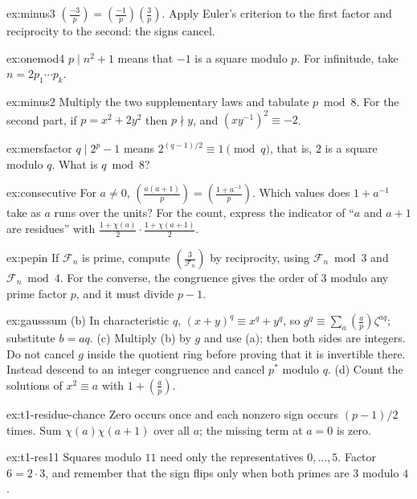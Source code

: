\begin{hint}{ex:minus3}
$\left(\frac{-3}p\right)=\left(\frac{-1}p\right)\left(\frac3p\right)$. Apply Euler's criterion to the first factor and reciprocity to the second: the signs cancel.
\end{hint}
\begin{hint}{ex:onemod4}
$p\mid n^2+1$ means that $-1$ is a square modulo $p$. For infinitude, take $n=2p_1\cdots p_k$.
\end{hint}
\begin{hint}{ex:minus2}
Multiply the two supplementary laws and tabulate $p\bmod8$. For the second part, if $p=x^2+2y^2$ then $p\nmid y$, and $(xy^{-1})^2\equiv-2$.
\end{hint}
\begin{hint}{ex:mersfactor}
$q\mid2^p-1$ means $2^{(q-1)/2}\equiv1\pmod q$, that is, $2$ is a square modulo $q$. What is $q\bmod8$?
\end{hint}
\begin{hint}{ex:consecutive}
For $a\ne0$, $\left(\frac{a(a+1)}p\right)=\left(\frac{1+a^{-1}}p\right)$. Which values does $1+a^{-1}$ take as $a$ runs over the units? For the count, express the indicator of ``$a$ and $a+1$ are residues'' with $\frac{1+\chi(a)}2\cdot\frac{1+\chi(a+1)}2$.
\end{hint}
\begin{hint}{ex:pepin}
If $\mathcal F_n$ is prime, compute $\left(\frac3{\mathcal F_n}\right)$ by reciprocity, using $\mathcal F_n\bmod3$ and $\mathcal F_n\bmod4$. For the converse, the congruence gives the order of $3$ modulo any prime factor $p$, and it must divide $p-1$.
\end{hint}
\begin{hint}{ex:gausssum}
(b) In characteristic $q$, $(x+y)^q\equiv x^q+y^q$, so $g^q\equiv\sum_a\left(\frac ap\right)\zeta^{aq}$; substitute $b=aq$. (c) Multiply (b) by $g$ and use (a); then both sides are integers. Do not cancel $g$ inside the quotient ring before proving that it is invertible there. Instead descend to an integer congruence and cancel $p^*$ modulo $q$. (d) Count the solutions of $x^2\equiv a$ with $1+\left(\frac ap\right)$.
\end{hint}

\begin{hint}{ex:t1-residue-chance}
Zero occurs once and each nonzero sign occurs $(p-1)/2$ times.
Sum $\chi(a)\chi(a+1)$ over all $a$; the missing term at $a=0$ is zero.
\end{hint}

\begin{hint}{ex:t1-res11}
Squares modulo $11$ need only the representatives $0,\ldots,5$. Factor $6=2\cdot 3$, and remember that the sign flips only when both primes are $3$ modulo $4$.
\end{hint}

